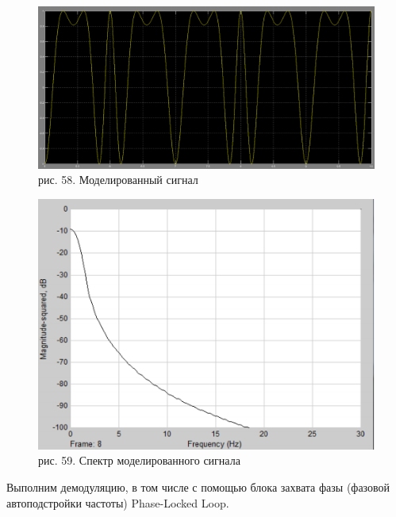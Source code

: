 \documentclass[10pt,a4paper]{report}
\begin{document}
\begin{figure}
\begin{center}
\includegraphics[width=150mm, scale = 0.9]{8_9}\newline
рис. 58. Моделированный сигнал\newline
\end{center}
\end{figure}
\begin{figure}
\begin{center}
\includegraphics[width=150mm, scale = 0.9]{8_10}\newline
рис. 59. Спектр моделированного сигнала\newline
\end{center}
\end{figure}
Выполним демодуляцию, в том числе с помощью блока захвата фазы (фазовой автоподстройки частоты) Phase-Locked Loop.
\end{document}

